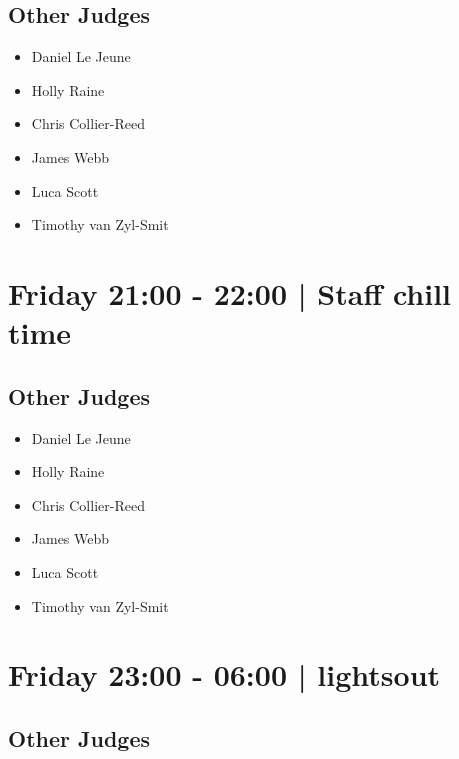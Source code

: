 \documentclass[10pt]{article}
\begin{document}
        \subsection*{Other Judges}
        
            \begin{itemize}
                            \item Daniel Le Jeune
                            \item Holly Raine
                            \item Chris Collier-Reed
                            \item James Webb
                            \item Luca Scott
                            \item Timothy van Zyl-Smit
                        \end{itemize}
        

            \section*{Friday 21:00
        -
        22:00
        |
         Staff chill time}
        
                
        \subsection*{Other Judges}
        
            \begin{itemize}
                            \item Daniel Le Jeune
                            \item Holly Raine
                            \item Chris Collier-Reed
                            \item James Webb
                            \item Luca Scott
                            \item Timothy van Zyl-Smit
                        \end{itemize}
        

            \section*{Friday 23:00
        -
        06:00
        |
         lightsout}
        
                
        \subsection*{Other Judges}
        
\end{document}
